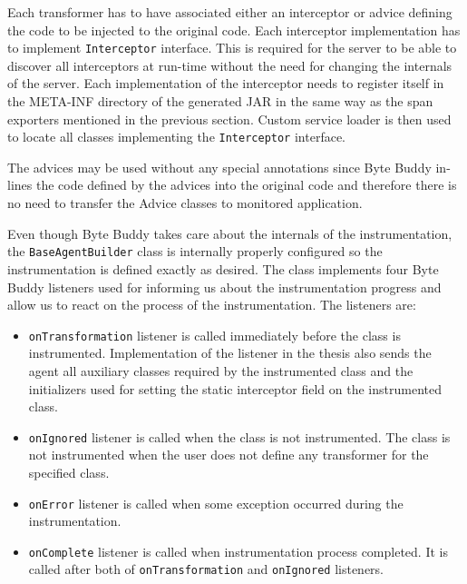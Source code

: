 Each transformer has to have associated either an interceptor or advice defining the code to be injected to the original code. Each interceptor implementation has to implement \texttt{Interceptor} interface. This is required for the server to be able to discover all interceptors at run-time without the need for changing the internals of the server. Each implementation of the interceptor needs to register itself in the META-INF directory of the generated JAR in the same way as the span exporters mentioned in the previous section. Custom service loader is then used to locate all classes implementing the \texttt{Interceptor} interface. 

The advices may be used without any special annotations since Byte Buddy in-lines the code defined by the advices into the original code and therefore there is no need to transfer the Advice classes to monitored application.

Even though Byte Buddy takes care about the internals of the instrumentation, the \texttt{BaseAgentBuilder} class is internally properly configured so the instrumentation is defined exactly as desired. The class implements four Byte Buddy listeners used for informing us about the instrumentation progress and allow us to react on the process of the instrumentation. The listeners are:
\begin{itemize}
	\item \texttt{onTransformation} listener is called immediately before the class is instrumented.  Implementation of the listener in the thesis also sends the agent all auxiliary classes required by the instrumented class and the initializers used for setting the static interceptor field on the instrumented class.
	\item \texttt{onIgnored} listener is called when the class is not instrumented. The class is not instrumented when the user does not define any transformer for the specified class.
	\item \texttt{onError} listener is called when some exception occurred during the instrumentation.
	\item \texttt{onComplete} listener is called when instrumentation process completed. It is called after both of \texttt{onTransformation} and \texttt{onIgnored} listeners.
\end{itemize}

